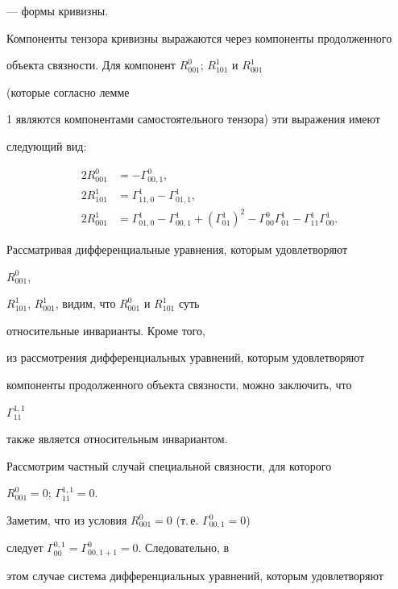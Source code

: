 --- формы кривизны. 


 


Компоненты тензора кривизны выражаются через компоненты продолженного 


объекта связности. Для компонент $R^0_{001}$; $R^1_{101}$ и $R^1_{001}$ 


(которые согласно лемме 


1 являются компонентами самостоятельного тензора) эти выражения имеют 


следующий вид: 


\begin{align*} 


2R^0_{001}&=-\Gamma^0_{00,1},\\ 


2R^1_{101}&=\Gamma^1_{11,0}-\Gamma^1_{01,1},\\ 


2R^1_{001}&=\Gamma^1_{01,0}-\Gamma^1_{00,1}+ 


(\Gamma^1_{01})^2-\Gamma^0_{00}\Gamma^1_{01}- 


\Gamma^1_{11}\Gamma^1_{00}. 


\end{align*} 


 


Рассматривая дифференциальные уравнения, которым удовлетворяют 


$R^0_{001}$, 


$R^1_{101}$, $R^1_{001}$, видим, что $R^0_{001}$ и $R^1_{101}$ суть 


относительные инварианты. Кроме того, 


из рассмотрения дифференциальных уравнений, которым удовлетворяют 


компоненты продолженного объекта связности, можно заключить, что 


$\Gamma^{1,1}_{11}$ 


также является относительным инвариантом. 


 


Рассмотрим частный случай специальной связности, для которого 


$R^0_{001}=0$; $\Gamma^{1,1}_{11}=0$. 


Заметим, что из условия $R^0_{001}=0$ (т.\,е. $\Gamma^0_{00,1}=0$) 


следует $\Gamma^{0,1}_{00}=\Gamma^0_{00,1+1}=0$. Следовательно, в 


этом случае система дифференциальных уравнений, которым удовлетворяют 


